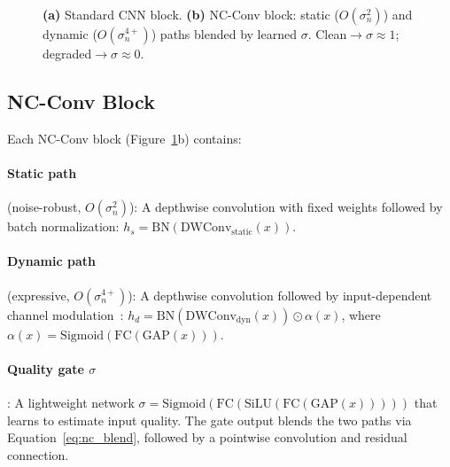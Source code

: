 \documentclass{bmvc2k}
\begin{document}
\begin{figure}[t]
{%
}
\caption{\textbf{(a)} Standard CNN block. \textbf{(b)} NC-Conv block: \textcolor{fixcolor}{static} ($O(\sigma_n^2)$) and \textcolor{dyncolor}{dynamic} ($O(\sigma_n^{4+})$) paths blended by learned $\sigma$. Clean$\to\sigma{\approx}1$; degraded$\to\sigma{\approx}0$.}
\label{fig:ncconv}
\end{figure}

\subsection{NC-Conv Block}

Each NC-Conv block (Figure~\ref{fig:ncconv}b) contains:

\paragraph{Static path} (noise-robust, $O(\sigma_n^2)$): A depthwise convolution with fixed weights followed by batch normalization:
$h_s = \text{BN}(\text{DWConv}_{\text{static}}(x))$.

\paragraph{Dynamic path} (expressive, $O(\sigma_n^{4+})$): A depthwise convolution followed by input-dependent channel modulation~\cite{hu2018squeeze}:
$h_d = \text{BN}(\text{DWConv}_{\text{dyn}}(x)) \odot \alpha(x)$,
where $\alpha(x) = \text{Sigmoid}(\text{FC}(\text{GAP}(x)))$.

\paragraph{Quality gate $\sigma$}: A lightweight network $\sigma = \text{Sigmoid}(\text{FC}(\text{SiLU}(\text{FC}(\text{GAP}(x)))))$ that learns to estimate input quality.
The gate output blends the two paths via Equation~\ref{eq:nc_blend}, followed by a pointwise convolution and residual connection.
\end{document}
